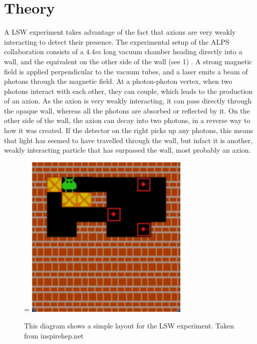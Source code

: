 \documentclass[12pt]{article}
\begin{document}
\section{Theory}
\label{sec:theory}

A LSW experiment takes advantage of the fact that axions are very weakly interacting to detect their presence. The experimental setup of the ALPS collaboration consists of a $4.4m$ long vacuum chamber heading directly into a wall, and the equivalent on the other side of the wall (see 1) \autocite{http://inspirehep.net/record/791128/plots, 07/05/2014}. A strong magnetic field is applied perpendicular to the vacuum tubes, and a laser emits a beam of photons through the magnetic field. At a photon-photon vertex, when two photons interact with each other, they can couple, which leads to the production of an axion. As the axion is very weakly interacting, it can pass directly through the opaque wall, whereas all the photons are absorbed or reflected by it. On the other side of the wall, the axion can decay into two photons, in a reverse way to how it was created. If the detector on the right picks up any photons, this means that light has seemed to have travelled through the wall, but infact it is another, weakly interacting particle that has surpassed the wall, most probably an axion.

\begin{figure}[h]=
\centering
\includegraphics[width=0.7\textwidth]{Images/sokoban_cas_1.png}
\caption{\label{fig:RMPfig23.jpg}This diagram shows a simple layout for the LSW experiment. Taken from inspirehep.net}
\end{figure}
\end{document}
